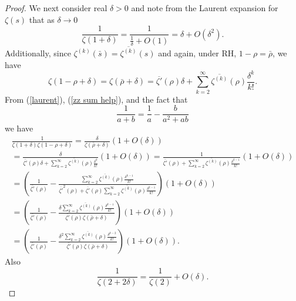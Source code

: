 \documentclass[11pt,article]{amsart}
\numberwithin{equation}{section}
\numberwithin{equation}{section}
\numberwithin{lemma}{section}
\numberwithin{prop}{section}
\begin{document}
\begin{proof}
We next consider real $\delta>0$ and note from the Laurent expansion for $\zeta(s)$ that as $\delta \rightarrow 0$
\begin{equation}
\frac{1}{\zeta(1+\delta)}=\frac{1}{\frac{1}{\delta}+O(1)}=\delta+O\left(\delta^{2}\right). \label{laurent}
\end{equation}
Additionally, since $\zeta^{(k)}(\bar{s})=\overline{\zeta^{(k)}}(s)$ and again, under RH, $1-\rho=\bar{\rho}$, we have  
\begin{equation}
\zeta(1-\rho+\delta)=\zeta\left(\bar{\rho}+\delta\right)=\overline{\zeta'}(\rho)\delta+\sum_{k=2}^{\infty}\overline{\zeta^{(k)}}(\rho)\frac{\delta^{k}}{k!}. \label{zz sum help}
\end{equation}
From (\ref{laurent}), (\ref{zz sum help}), and the fact that 
\begin{equation}
\frac{1}{a+b}=\frac{1}{a}-\frac{b}{a^{2}+ab} \label{fractions!}
\end{equation}
we have 
\begin{align}
\frac{1}{\zeta(1+\delta)\zeta(1-\rho+\delta)}=\frac{\delta}{\zeta\left(\bar{\rho}+\delta\right)}\left(1+O\left(\delta\right)\right) \nonumber \\=\frac{\delta}{\overline{\zeta'}(\rho)\delta+\sum_{k=2}^{\infty}\overline{\zeta^{(k)}}(\rho)\frac{\delta^{k}}{k!}}\left(1+O(\delta)\right)=\frac{1}{\overline{\zeta'}(\rho)+\sum_{k=2}^{\infty}\overline{\zeta^{(k)}}(\rho)\frac{\delta^{k-1}}{k!}}\left(1+O(\delta)\right)\nonumber \\ 
=\left(\frac{1}{\overline{\zeta'}(\rho)}-\frac{\sum_{k=2}^{\infty}\overline{\zeta^{(k)}}(\rho)\frac{\delta^{k-1}}{k!}}{\overline{\zeta'}^{2}(\rho)+\overline{\zeta'}(\rho)\sum_{k=2}^{\infty}\overline{\zeta^{(k)}}(\rho)\frac{\delta^{k-1}}{k!}}\right)\left(1+O(\delta)\right)\nonumber \\
=\left(\frac{1}{\overline{\zeta'}(\rho)}-\frac{\delta\sum_{k=2}^{\infty}\overline{\zeta^{(k)}}(\rho)\frac{\delta^{k-1}}{k!}}{\overline{\zeta'}(\rho)\zeta\left(\bar{\rho}+\delta\right)}\right)\left(1+O(\delta)\right)\nonumber \\
=\left(\frac{1}{\overline{\zeta'}(\rho)}-\frac{\delta^{2}\sum_{k=2}^{\infty}\overline{\zeta^{(k)}}(\rho)\frac{\delta^{k-2}}{k!}}{\overline{\zeta'}(\rho)\zeta\left(\bar{\rho}+\delta\right)}\right)\left(1+O(\delta)\right). \label{long one}
\end{align}
Also 
\begin{equation}
\frac{1}{\zeta(2+2\delta)}=\frac{1}{\zeta(2)}+O(\delta). \label{lame help}
\end{equation}

\end{proof}
\end{document}

